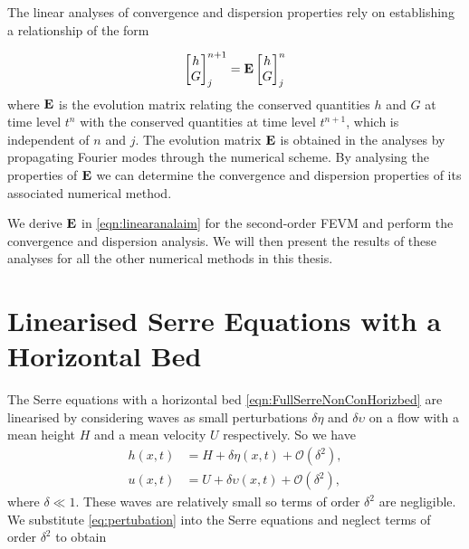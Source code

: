 The linear analyses of convergence and dispersion properties rely on establishing a relationship of the form

\begin{equation}
\label{eqn:linearanalaim}
\begin{bmatrix}
h \\G
\end{bmatrix}^{n+1}_j = \mathbf{E} \begin{bmatrix}
h \\G
\end{bmatrix}^{n}_j
\end{equation}
 where $\mathbf{E}$ is the evolution matrix relating the conserved quantities $h$ and $G$ at time level $t^n$ with the conserved quantities at time level $t^{n+1}$, which is independent of $n$ and $j$. The evolution matrix $\mathbf{E}$ is obtained in the analyses by propagating Fourier modes through the numerical scheme. By analysing the properties of $\mathbf{E}$ we can determine the convergence and dispersion properties of its associated numerical method.
 
 We derive $\mathbf{E}$ in \eqref{eqn:linearanalaim} for the second-order FEVM and perform the convergence and dispersion analysis. We will then present the results of these analyses for all the other numerical methods in this thesis.
 
\section{Linearised Serre Equations with a Horizontal Bed}
The Serre equations with a horizontal bed \eqref{eqn:FullSerreNonConHorizbed} are linearised by considering waves as small perturbations $\delta\eta$ and $\delta\upsilon$ on a flow with a mean height $H$ and a mean velocity $U$ respectively. So we have
\begin{subequations}
	\label{eq:pertubation}
\begin{align}
h(x,t) &= H + \delta \eta(x,t) + \mathcal{O}\left(\delta^2 \right), \\
u(x,t) &= U + \delta \upsilon(x,t) + \mathcal{O}\left(\delta^2 \right),
\end{align}
\end{subequations}
where $\delta \ll 1$. These waves are relatively small so terms of order $\delta^2$ are negligible. We substitute \eqref{eq:pertubation} into the Serre equations and neglect terms of order $\delta^2$ to obtain

